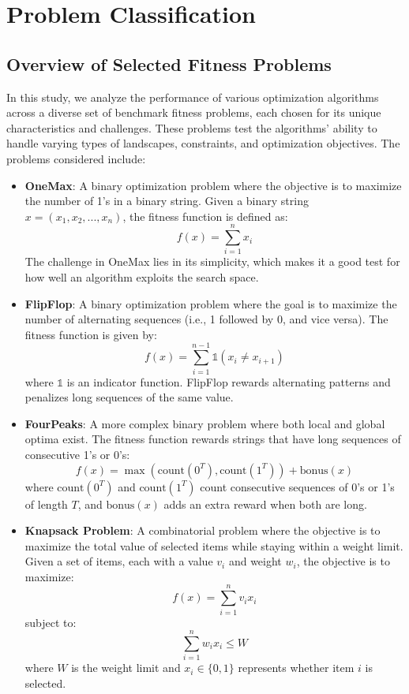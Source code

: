 \section{Problem Classification}

\subsection{Overview of Selected Fitness Problems}
In this study, we analyze the performance of various optimization algorithms across a diverse set of benchmark fitness problems, each chosen for its unique characteristics and challenges. These problems test the algorithms' ability to handle varying types of landscapes, constraints, and optimization objectives. The problems considered include:
\begin{itemize}
    \item \textbf{OneMax}: A binary optimization problem where the objective is to maximize the number of 1's in a binary string. Given a binary string \(x = (x_1, x_2, ..., x_n)\), the fitness function is defined as:
    \[
    f(x) = \sum_{i=1}^{n} x_i
    \]
    The challenge in OneMax lies in its simplicity, which makes it a good test for how well an algorithm exploits the search space.

    \item \textbf{FlipFlop}: A binary optimization problem where the goal is to maximize the number of alternating sequences (i.e., 1 followed by 0, and vice versa). The fitness function is given by:
    \[
    f(x) = \sum_{i=1}^{n-1} \mathbb{1}(x_i \neq x_{i+1})
    \]
    where \( \mathbb{1} \) is an indicator function. FlipFlop rewards alternating patterns and penalizes long sequences of the same value.

    \item \textbf{FourPeaks}: A more complex binary problem where both local and global optima exist. The fitness function rewards strings that have long sequences of consecutive 1's or 0's:
    \[
    f(x) = \max\left(\text{count}(0^T), \text{count}(1^T)\right) + \text{bonus}(x)
    \]
    where \( \text{count}(0^T) \) and \( \text{count}(1^T) \) count consecutive sequences of 0's or 1's of length \(T\), and \( \text{bonus}(x) \) adds an extra reward when both are long.

    \item \textbf{Knapsack Problem}: A combinatorial problem where the objective is to maximize the total value of selected items while staying within a weight limit. Given a set of items, each with a value \(v_i\) and weight \(w_i\), the objective is to maximize:
    \[
    f(x) = \sum_{i=1}^{n} v_i x_i
    \]
    subject to:
    \[
    \sum_{i=1}^{n} w_i x_i \leq W
    \]
    where \( W \) is the weight limit and \( x_i \in \{0, 1\} \) represents whether item \(i\) is selected.


\end{itemize}
